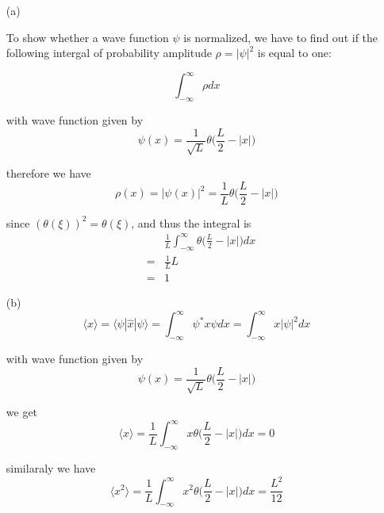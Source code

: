 \documentclass[11pt,a4paper]{article}
\newcommand{\bra}{\langle}
\newcommand{\ket}{\rangle}
\begin{document}
\begin{enumerate}

\item[(a)]

    To show whether a wave function $\psi$ is normalized, we have to find out if the following intergal of probability amplitude $\rho=|\psi|^2$ is equal to one:

    \begin{equation}
        \int_{-\infty}^{\infty}\rho dx
    \end{equation}

    with wave function given by
    \begin{equation}
        \psi(x)=\frac{1}{\sqrt{L}}\theta\bigg(\frac{L}{2}-|x|\bigg)
    \end{equation}

    therefore we have
    \begin{equation}
        \rho(x)=|\psi(x)|^2=\frac{1}{L}\theta\bigg(\frac{L}{2}-|x|\bigg)
    \end{equation}

    since $(\theta(\xi))^2=\theta(\xi)$, and thus the integral is
    \begin{eqnarray}
        &&\frac{1}{L}\int_{-\infty}^{\infty}\theta\bigg(\frac{L}{2}-|x|\bigg) dx\\
        &=&\frac{1}{L}L\\
        &=&1
    \end{eqnarray}

    \item[(b)]
    \begin{equation}
        \bra x \ket=\bra \psi | \hat{x} | \psi \ket=\int_{-\infty}^{\infty}\psi^*x\psi dx=\int_{-\infty}^{\infty}x|\psi|^2 dx
    \end{equation}

    with wave function given by
    \begin{equation}
        \psi(x)=\frac{1}{\sqrt{L}}\theta\bigg(\frac{L}{2}-|x|\bigg)
    \end{equation}

    we get 
    \begin{equation}
        \bra x \ket=\frac{1}{L}\int_{-\infty}^{\infty}x\theta\bigg(\frac{L}{2}-|x|\bigg)dx=0
    \end{equation}

    similaraly we have
    \begin{equation}
        \bra x^2 \ket
        =\frac{1}{L}\int_{-\infty}^{\infty}x^2\theta\bigg(\frac{L}{2}-|x|\bigg)dx
        =\frac{L^2}{12}
    \end{equation}


\end{enumerate}
\end{document}
